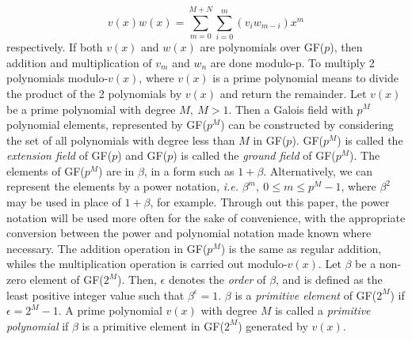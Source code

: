 \begin{equation*}
v(x)w(x)=\sum_{m=0}^{ M+N} \sum_{i=0}^{m} (v_i w_{m-i})x^m
\end{equation*}
 respectively.
If both $v(x)$ and $w(x)$ are polynomials over GF($p$), then addition and multiplication of $v_m$ and $w_n$ are done modulo-p.
To multiply 2 polynomials modulo-$v(x)$, where $v(x)$ is a prime polynomial means to divide the product of the 2 polynomials by $v(x)$ and return the remainder.
Let $v(x)$ be a prime polynomial with degree $M,~M>1$. Then a Galois field with $p^M$ polynomial elements, represented by GF($p^M$) can be constructed by considering the set of all polynomials with degree less than $M$ in GF($p$).
GF($p^M$) is called the \textit{extension field} of GF($p$) and GF($p$) is called the \textit{ground field} of GF($p^M$).
The elements of GF($p^M$) are in $\beta$, in a form such as $1+\beta$. Alternatively, we can represent the elements by a power notation, \textit{i.e.} $\beta^m,~0 \leq m \leq p^M-1$, where $\beta^2$ may be used in place of $1+\beta$, for example. Through out this paper, the power notation will be used more often for the sake of convenience, with the appropriate conversion between the power and polynomial notation made known where necessary.  The addition operation in GF($p^M$) is the same as regular addition, whiles the multiplication operation is carried out modulo-$v(x)$.
Let $\beta$ be a non-zero element of GF($2^M$). Then, $\epsilon$ denotes the \textit{order} of $\beta$, and is defined as the least positive integer value such that $\beta^{\epsilon}=1$. $\beta$ is a \textit{primitive element} of GF($2^M$) if $\epsilon=2^M-1$. A prime polynomial $v(x)$ with degree $M$ is called a \textit{primitive polynomial} if $\beta$ is a primitive element in GF($2^M$) generated by $v(x)$. 


 







